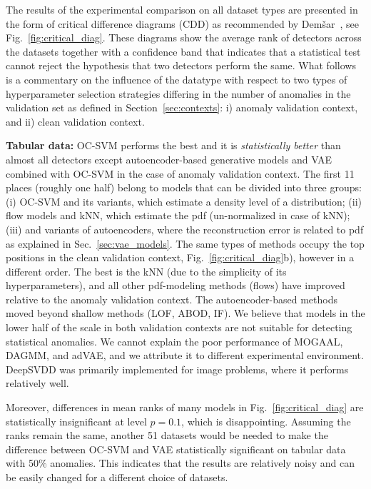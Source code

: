 The results of the experimental comparison on all dataset types are presented in the form of critical difference diagrams (CDD) as recommended by Dem\v{s}ar~\cite{demvsar2006statistical}, see Fig.~\ref{fig:critical_diag}. These diagrams show the average rank of detectors across the datasets together with a confidence band that indicates that a statistical test cannot reject the hypothesis that two detectors perform the same. What follows is a commentary on the influence of the datatype with respect to two types of hyperparameter selection strategies differing in the number of anomalies in the validation set as defined in Section~\ref{sec:contexts}: i) anomaly validation context, and ii) clean validation context.

\textbf{Tabular data:} OC-SVM performs the best and it is \emph{statistically better} than almost all detectors except autoencoder-based generative models and VAE combined with OC-SVM in the case of anomaly validation context. The first 11 places (roughly one half) belong to models that can be divided into three groups: (i) OC-SVM and its variants, which estimate a density level of a distribution; (ii) flow models and kNN, which estimate the pdf (un-normalized in case of kNN); (iii) and variants of autoencoders, where the reconstruction error is related to pdf as explained in Sec.~\ref{sec:vae_models}. The same types of methods occupy the top positions in the clean validation context, Fig.~\ref{fig:critical_diag}b), however in a different order. The best is the kNN (due to the simplicity of its hyperparameters), and all other pdf-modeling methods (flows) have improved relative to the anomaly validation context. The autoencoder-based methods moved beyond shallow methods (LOF, ABOD, IF). We believe that models in the lower half of the scale in both validation contexts are not suitable for detecting statistical anomalies. We cannot explain the poor performance of MOGAAL, DAGMM, and adVAE, and we attribute it to different experimental environment. DeepSVDD was primarily implemented for image problems, where it performs relatively well.

Moreover, differences in mean ranks of many models in Fig.~\ref{fig:critical_diag} are statistically insignificant at level $p=0.1$, which is disappointing. Assuming the ranks remain the same, another 51 datasets would be needed to make the difference between OC-SVM and VAE statistically significant on tabular data with 50\% anomalies. This indicates that the results are relatively noisy and can be easily changed for a different choice of datasets.

